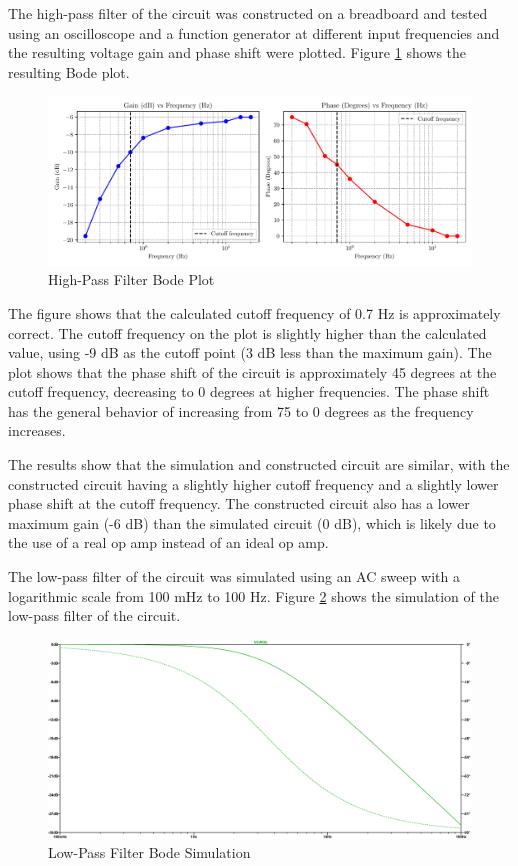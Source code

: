 \documentclass[CMPE]{KGCOEReport}
\begin{document}
The high-pass filter of the circuit was constructed on a breadboard and tested using an oscilloscope and a function generator at different input frequencies and the resulting voltage gain and phase shift were plotted. Figure \ref{fig:highPassBode} shows the resulting Bode plot.

\begin{figure}[H]
    \centering
    \includegraphics[width=1\textwidth]{high_pass_plot.pdf}
    \caption{High-Pass Filter Bode Plot}
    \label{fig:highPassBode}
\end{figure}

The figure shows that the calculated cutoff frequency of 0.7 Hz is approximately correct. The cutoff frequency on the plot is slightly higher than the calculated value, using -9 dB as the cutoff point (3 dB less than the maximum gain). The plot shows that the phase shift of the circuit is approximately 45 degrees at the cutoff frequency, decreasing to 0 degrees at higher frequencies. The phase shift has the general behavior of increasing from 75 to 0 degrees as the frequency increases.

The results show that the simulation and constructed circuit are similar, with the constructed circuit having a slightly higher cutoff frequency and a slightly lower phase shift at the cutoff frequency. The constructed circuit also has a lower maximum gain (-6 dB) than the simulated circuit (0 dB), which is likely due to the use of a real op amp instead of an ideal op amp.

\bigskip

The low-pass filter of the circuit was simulated using an AC sweep with a logarithmic scale from 100 mHz to 100 Hz. Figure \ref{fig:lowPassSim} shows the simulation of the low-pass filter of the circuit.

\begin{figure}[H]
    \centering
    \includegraphics[width=1\textwidth]{SimFreqLowPass.png}
    \caption{Low-Pass Filter Bode Simulation}
    \label{fig:lowPassSim}
\end{figure}
\end{document}
